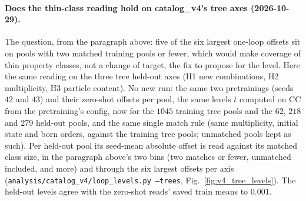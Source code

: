 \documentclass[11pt]{article}
\newcommand{\code}[1]{\texttt{#1}}
\begin{document}
\paragraph{Does the thin-class reading hold on catalog\_v4's tree axes (2026-10-29).}\label{par:v4_tree_levels} The
question, from the paragraph above: five of the six largest one-loop offsets sit on pools with two matched training
pools or fewer, which would make coverage of thin property classes, not a change of target, the fix to propose for the
level. Here the same reading on the three tree held-out axes (H1 new combinations, H2 multiplicity, H3 particle
content). No new run: the same two pretrainings (seeds $42$ and $43$) and their zero-shot offsets per pool, the same
levels $\overline t$ computed on CC from the pretraining's config, now for the $1045$ training tree pools and the $62$,
$218$ and $279$ held-out pools, and the same single match rule (same multiplicity, initial state and born orders,
against the training tree pools; unmatched pools kept as such). Per held-out pool its seed-mean absolute offset is
read against its matched class size, in the paragraph above's two bins (two matches or fewer, unmatched included, and
more) and through the six largest offsets per axis (\code{analysis/catalog\_v4/loop\_levels.py --trees},
Fig.~\ref{fig:v4_tree_levels}). The held-out levels agree with the zero-shot reads' saved train means to $0.001$.
\end{document}
